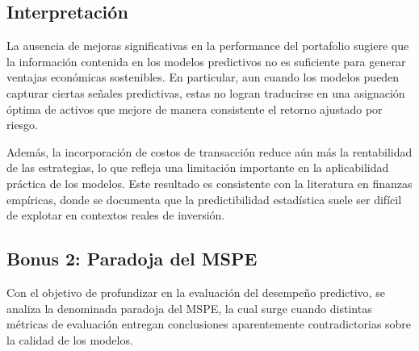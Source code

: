 \documentclass[11pt,a4paper]{article}
\begin{document}
	\subsection{Interpretación}
	La ausencia de mejoras significativas en la performance del portafolio sugiere que la información contenida en los modelos predictivos no es suficiente para generar ventajas económicas sostenibles. En particular, aun cuando los modelos pueden capturar ciertas señales predictivas, estas no logran traducirse en una asignación óptima de activos que mejore de manera consistente el retorno ajustado por riesgo.
	
	Además, la incorporación de costos de transacción reduce aún más la rentabilidad de las estrategias, lo que refleja una limitación importante en la aplicabilidad práctica de los modelos. Este resultado es consistente con la literatura en finanzas empíricas, donde se documenta que la predictibilidad estadística suele ser difícil de explotar en contextos reales de inversión.
	
	\subsection{Bonus 2: Paradoja del MSPE}
	
	Con el objetivo de profundizar en la evaluación del desempeño predictivo, se analiza la denominada paradoja del MSPE, la cual surge cuando distintas métricas de evaluación entregan conclusiones aparentemente contradictorias sobre la calidad de los modelos.
	
\end{document}
